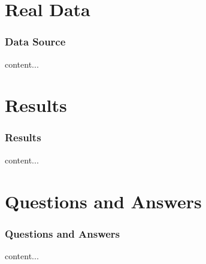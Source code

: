 \documentclass{beamer}
\begin{document}
\section{Real Data}

\begin{frame}
\frametitle{Data Source}
	content...
\end{frame}

\section{Results}

\begin{frame}
\frametitle{Results}
	content...
\end{frame}

\section{Questions and Answers}

\begin{frame}
\frametitle{Questions and Answers}
	content...
\end{frame}
\end{document}
